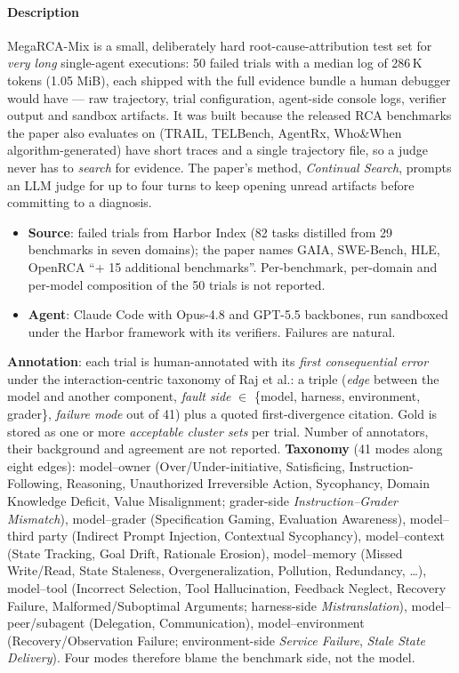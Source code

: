 \paragraph{Description} MegaRCA-Mix is a small, deliberately hard root-cause-attribution test set for \emph{very long} single-agent executions: 50 failed trials with a median log of 286\,K tokens (1.05 MiB), each shipped with the full evidence bundle a human debugger would have --- raw trajectory, trial configuration, agent-side console logs, verifier output and sandbox artifacts. It was built because the released RCA benchmarks the paper also evaluates on (TRAIL, TELBench, AgentRx, Who\&When algorithm-generated) have short traces and a single trajectory file, so a judge never has to \emph{search} for evidence. The paper's method, \emph{Continual Search}, prompts an LLM judge for up to four turns to keep opening unread artifacts before committing to a diagnosis.
\begin{itemize}
\item \textbf{Source}: failed trials from Harbor Index (82 tasks distilled from 29 benchmarks in seven domains); the paper names GAIA, SWE-Bench, HLE, OpenRCA ``+ 15 additional benchmarks''. Per-benchmark, per-domain and per-model composition of the 50 trials is not reported.
\item \textbf{Agent}: Claude Code with Opus-4.8 and GPT-5.5 backbones, run sandboxed under the Harbor framework with its verifiers. Failures are natural.
\end{itemize}
\textbf{Annotation}: each trial is human-annotated with its \emph{first consequential error} under the interaction-centric taxonomy of Raj et al.: a triple (\emph{edge} between the model and another component, \emph{fault side} $\in$ \{model, harness, environment, grader\}, \emph{failure mode} out of 41) plus a quoted first-divergence citation. Gold is stored as one or more \emph{acceptable cluster sets} per trial. Number of annotators, their background and agreement are not reported. \textbf{Taxonomy} (41 modes along eight edges): model--owner (Over/Under-initiative, Satisficing, Instruction-Following, Reasoning, Unauthorized Irreversible Action, Sycophancy, Domain Knowledge Deficit, Value Misalignment; grader-side \emph{Instruction--Grader Mismatch}), model--grader (Specification Gaming, Evaluation Awareness), model--third party (Indirect Prompt Injection, Contextual Sycophancy), model--context (State Tracking, Goal Drift, Rationale Erosion), model--memory (Missed Write/Read, State Staleness, Overgeneralization, Pollution, Redundancy, \ldots), model--tool (Incorrect Selection, Tool Hallucination, Feedback Neglect, Recovery Failure, Malformed/Suboptimal Arguments; harness-side \emph{Mistranslation}), model--peer/subagent (Delegation, Communication), model--environment (Recovery/Observation Failure; environment-side \emph{Service Failure}, \emph{Stale State Delivery}). Four modes therefore blame the benchmark side, not the model.

